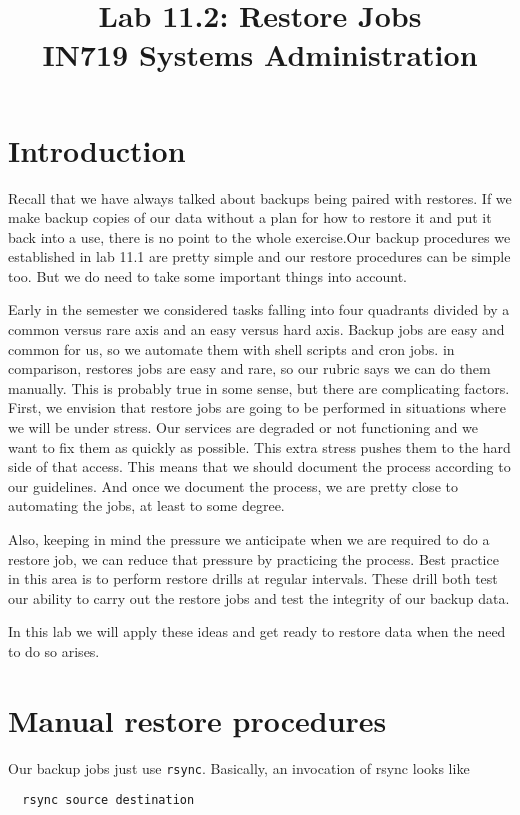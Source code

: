 \documentclass{article}   	%
\title{Lab 11.2:  Restore Jobs\\ IN719 Systems Administration}
\date{}							%
\begin{document}
\maketitle

\section*{Introduction}
Recall that we have always talked about backups being paired with restores. If we make backup copies of our data without a plan for how to restore it and put it back into a use, there is no point to the whole exercise.Our backup procedures we established in lab 11.1 are pretty simple and our restore procedures can be simple too. But we do need to take some important things into account.

Early in the semester we considered tasks falling into four quadrants divided by a common versus rare axis and an easy versus hard axis. Backup jobs are easy and common for us, so we automate them with shell scripts and cron jobs. in comparison, restores jobs are easy and rare, so our rubric says we can do them manually. This is probably true in some sense, but there are complicating factors. First, we envision that restore jobs are going to be performed in situations where we will be under stress. Our services are degraded or not functioning and we want to fix them as quickly as possible. This extra stress pushes them to the hard side of that access. This means that we should document the process according to our guidelines. And once we document the process, we are pretty close to automating the jobs, at least to some degree.

Also, keeping in mind the pressure we anticipate when we are required to do a restore job, we can reduce that pressure by practicing the process. Best practice in this area is to perform restore drills at regular intervals. These drill both test our ability to carry out the restore jobs and test the integrity of our backup data.

In this lab we will apply these ideas and get ready to restore data when the need to do so arises.

\section{Manual restore procedures}
Our backup jobs just use \texttt{rsync}. Basically, an invocation of rsync looks like

\begin{verbatim}
  rsync source destination
\end{verbatim}
\end{document}
